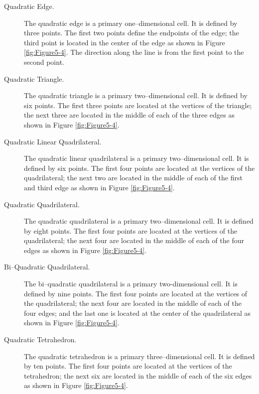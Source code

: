 \begin{description}

\item[Quadratic Edge.] The quadratic edge is a primary one--dimensional cell. It is defined by three points. The first two points define the endpoints of the edge; the third point is located in the center of the edge as shown in Figure \ref{fig:Figure5-4}. The direction along the line is from the first point to the second point.

\item[Quadratic Triangle.] The quadratic triangle is a primary two--dimensional cell. It is defined by six points. The first three points are located at the vertices of the triangle; the next three are located in the middle of each of the three edges as shown in Figure \ref{fig:Figure5-4}.

\item[Quadratic Linear Quadrilateral.] The quadratic linear quadrilateral is a primary two--dimensional cell. It is defined by six points. The first four points are located at the vertices of the quadrilateral; the next two are located in the middle of each of the first and third edge as shown in Figure \ref{fig:Figure5-4}.

\item[Quadratic Quadrilateral.] The quadratic quadrilateral is a primary two--dimensional cell. It is defined by eight points. The first four points are located at the vertices of the quadrilateral; the next four are located in the middle of each of the four edges as shown in Figure \ref{fig:Figure5-4}.

\item[Bi--Quadratic Quadrilateral.] The bi--quadratic quadrilateral is a primary two-dimensional cell. It is defined by nine points. The first four points are located at the vertices of the quadrilateral; the next four are located in the middle of each of the four edges; and the last one is located at the center of the quadrilateral as shown in Figure \ref{fig:Figure5-4}.

\item[Quadratic Tetrahedron.] The quadratic tetrahedron is a primary three--dimensional cell. It is defined by ten points. The first four points are located at the vertices of the tetrahedron; the next six are located in the middle of each of the six edges as shown in Figure \ref{fig:Figure5-4}.


\end{description}
